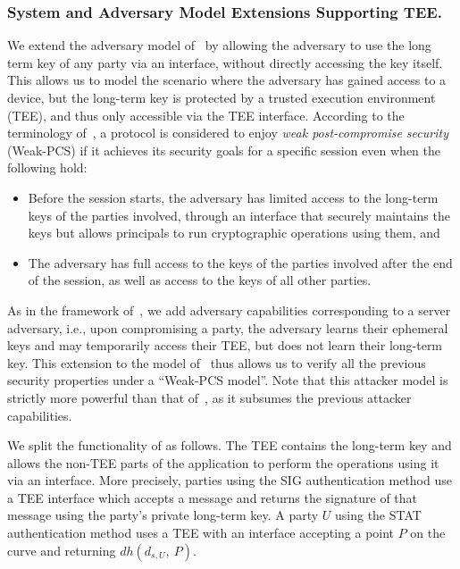 \documentclass[runningheads]{llncs}
\newcommand{\mConstStyle}[1]{\textsf{#1}}
\newcommand{\mMethodStyle}[1]{\mConstStyle{#1}}
\newcommand{\mProtocolStyle}[1]{\text{#1}}
\newcommand{\mEdhoc}{\mProtocolStyle{EDHOC}}
\newcommand{\mStat}{\mMethodStyle{STAT}}
\newcommand{\mSig}{\mMethodStyle{SIG}}
\newcommand{\mGu}{\ensuremath{Q_{s,U}}}
\newcommand{\mPriv}[1]{\ensuremath{d_{s,#1}}}
\newcommand{\mDH}{\ensuremath{\mathit{dh}}}
\begin{document}
\subsubsection{System and Adversary Model Extensions Supporting TEE.}
\label{sec:TEE:advModel}
%
We extend the adversary model of~\cite{Norr21} by allowing the adversary to 
use the long term key of any party via an interface, without directly accessing 
the key itself.
%
This allows us to model the scenario where the adversary has gained access to
a device, but the long-term key is protected by a trusted execution
environment (TEE), and thus only accessible via the TEE interface.
%
According to the terminology of~\cite{DBLP:conf/csfw/Cohn-GordonCG16}, a
protocol is considered to enjoy \emph{weak post-compromise security}
(Weak-PCS) if it achieves its security goals for a specific session
even when the following hold:
\begin{itemize}
\item Before the session starts, the adversary has limited access to the 
long-term 
keys of the parties involved, through an interface that securely maintains 
the keys but allows principals to run cryptographic operations using them, and
\item The adversary has full access to the keys of the parties involved after the 
end of the session, as well as access to the keys of all other parties.
\end{itemize}
%
As in the framework of~\cite{DBLP:conf/icics/XuZRWTZ20}, we add 
adversary
capabilities corresponding to a server adversary, i.e., upon 
compromising a party, the adversary learns their ephemeral keys and may temporarily access their TEE, but does not learn their long-term key.
%
This extension to the model of~\cite{Norr21} thus allows us to verify all the
previous security properties under a ``Weak-PCS model''.
%
Note that this attacker model is strictly more powerful than that 
of~\cite{Norr21}, as it subsumes the previous attacker capabilities.
%

We split the functionality of \mEdhoc{} as follows.
%
The TEE contains the long-term key and allows the non-TEE parts of the
application to perform the operations using it via an interface.
%
More precisely, parties using the \mSig{} authentication method use a TEE 
interface which accepts a message and returns the signature of that 
message using the party's private long-term key.
%
A party $U$ using the \mStat{} authentication method uses a TEE with an 
interface accepting a point $P$ on the curve and 
returning $\mDH(\mPriv{U},\ P)$.
%
\end{document}
